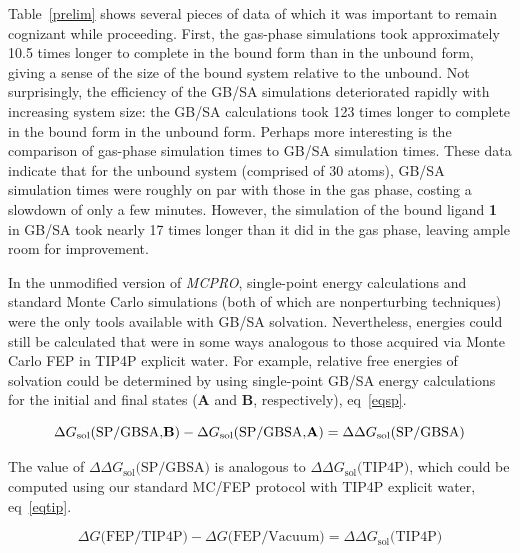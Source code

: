 \documentclass[12pt]{report}
\def\tablab{Table}\def\tabslab{\tablab s}
\def\equlab{eq}\def\equslab{Eqs.}
\newcommand*\eq[1]{\equlab~\ref{#1}}
\newcommand*\tbl[1]{\tablab~\ref{#1}}
\begin{document}
\tbl{prelim} shows several pieces of data of which it was important to remain cognizant while proceeding. First, the gas-phase simulations took approximately 10.5 times longer to complete in the bound form than in the unbound form, giving a sense of the size of the bound system relative to the unbound. Not surprisingly, the efficiency of the GB/SA simulations deteriorated rapidly with increasing system size: the GB/SA calculations took 123 times longer to complete in the bound form in the unbound form. Perhaps more interesting is the comparison of gas-phase simulation times to GB/SA simulation times. These data indicate that for the unbound system (comprised of 30 atoms), GB/SA simulation times were roughly on par with those in the gas phase, costing a slowdown of only a few minutes. However, the simulation of the bound ligand \textbf{1} in GB/SA took nearly 17 times longer than it did in the gas phase, leaving ample room for improvement.

In the unmodified version of \textit{MCPRO}, single-point energy calculations and standard Monte Carlo simulations (both of which are nonperturbing techniques) were the only tools available with GB/SA solvation. Nevertheless, energies could still be calculated that were in some ways analogous to those acquired via Monte Carlo FEP in TIP4P explicit water. For example, relative free energies of solvation could be determined by using single-point GB/SA energy calculations for the initial and final states (\textbf{A} and \textbf{B}, respectively), \eq{eqsp}.

\vspace*{-0.3cm}
\begin{equation}
\label{eqsp}
\Delta G_{\textrm{sol}} \textrm{(SP/GBSA,\textbf{B})} - \Delta G_{\textrm{sol}} \textrm{(SP/GBSA,\textbf{A})} = \Delta\Delta G_{\textrm{sol}}\textrm{(SP/GBSA)}
\end{equation}

The value of $\Delta\Delta G_{\textrm{sol}}\textrm{(SP/GBSA)}$ is analogous to $\Delta\Delta G_{\textrm{sol}}\textrm{(TIP4P)}$, which could be computed using our standard MC/FEP protocol with TIP4P explicit water, \eq{eqtip}.

\begin{equation}
\label{eqtip}
\Delta G \textrm{(FEP/TIP4P)} - \Delta G \textrm{(FEP/Vacuum)} = \Delta\Delta G_{\textrm{sol}}\textrm{(TIP4P)}
\end{equation}
\vspace*{-0.8cm}
\end{document}
